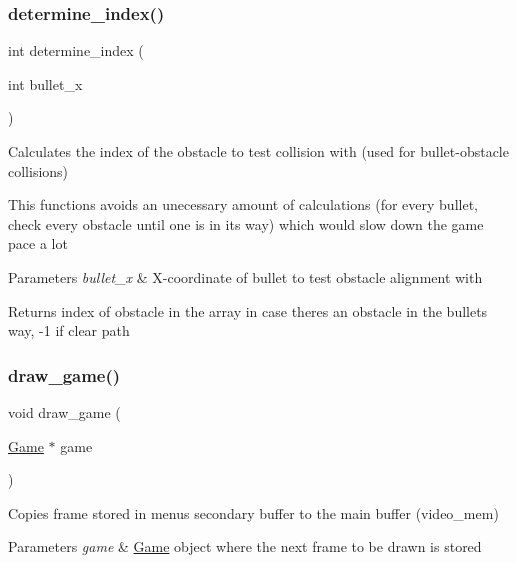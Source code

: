 \subsubsection{\texorpdfstring{determine\+\_\+index()}{determine\_index()}}
{\footnotesize\ttfamily int determine\+\_\+index (\begin{DoxyParamCaption}\item[{int}]{bullet\+\_\+x }\end{DoxyParamCaption})}



Calculates the index of the obstacle to test collision with (used for bullet-\/obstacle collisions) 

This functions avoids an unecessary amount of calculations (for every bullet, check every obstacle until one is in its way) which would slow down the game pace a lot


\begin{DoxyParams}{Parameters}
{\em bullet\+\_\+x} & X-\/coordinate of bullet to test obstacle alignment with \\
\hline
\end{DoxyParams}
\begin{DoxyReturn}{Returns}
index of obstacle in the array in case there\textquotesingle{}s an obstacle in the bullet\textquotesingle{}s way, -\/1 if clear path 
\end{DoxyReturn}
\hypertarget{group__game_ga0e5a63798b2083168206005d4b9dcd83}{}\label{group__game_ga0e5a63798b2083168206005d4b9dcd83} 
\subsubsection{\texorpdfstring{draw\+\_\+game()}{draw\_game()}}
{\footnotesize\ttfamily void draw\+\_\+game (\begin{DoxyParamCaption}\item[{\hyperlink{struct_game}{Game} $\ast$}]{game }\end{DoxyParamCaption})}



Copies frame stored in menu\textquotesingle{}s secondary buffer to the main buffer (video\+\_\+mem) 


\begin{DoxyParams}{Parameters}
{\em game} & \hyperlink{struct_game}{Game} \textquotesingle{}object\textquotesingle{} where the next frame to be drawn is stored \\
\hline
\end{DoxyParams}
\hypertarget{group__game_gaae19b3df5cdf51786306772dc362cc78}{}\label{group__game_gaae19b3df5cdf51786306772dc362cc78} 
